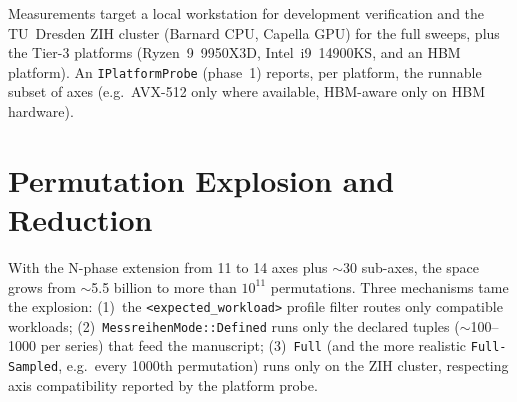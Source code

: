 Measurements target a local workstation for development verification and the TU~Dresden
ZIH cluster (Barnard CPU, Capella GPU) for the full sweeps, plus the Tier-3 platforms
(Ryzen~9~9950X3D, Intel~i9~14900KS, and an HBM platform). An \texttt{IPlatformProbe}
(phase~1) reports, per platform, the runnable subset of axes (e.g.\ AVX-512 only where
available, HBM-aware only on HBM hardware).

\section{Permutation Explosion and Reduction}\label{sec:explosion}

With the N-phase extension from 11 to 14 axes plus $\sim$30 sub-axes, the space grows from
$\sim$5.5 billion to more than $10^{11}$ permutations. Three mechanisms tame the
explosion: (1)~the \texttt{<expected\_workload>} profile filter routes only compatible
workloads; (2)~\texttt{MessreihenMode::Defined} runs only the declared tuples
($\sim$100--1000 per series) that feed the manuscript; (3)~\texttt{Full} (and the more
realistic \texttt{Full-Sampled}, e.g.\ every 1000th permutation) runs only on the ZIH
cluster, respecting axis compatibility reported by the platform probe.
